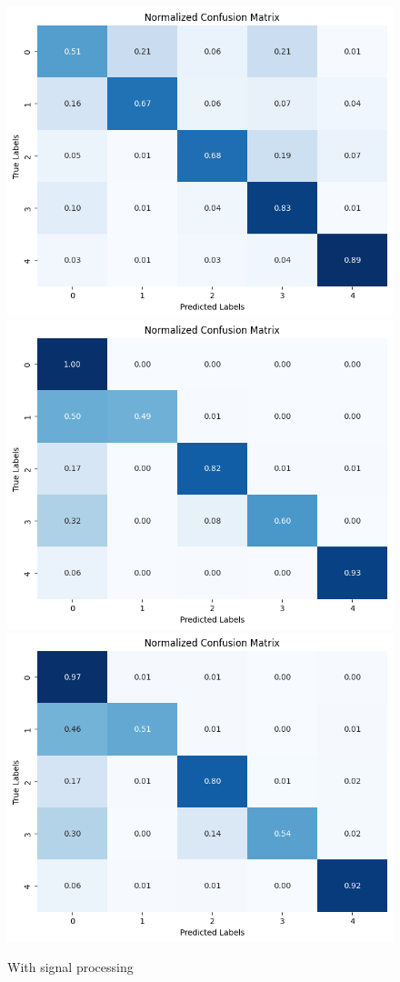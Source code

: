 \documentclass[runningheads]{llncs}
\begin{document}
\begin{figure}
    \centering
    \includegraphics[width=0.4\linewidth]{figs/svc_processed.png}
    \includegraphics[width=0.4\linewidth]{figs/random_forest_processed.png}
    \includegraphics[width=0.4\linewidth]{figs/d_tree_processed.png}
    \caption{With signal processing}
    \label{fig:data_transformed}
\end{figure}
\end{document}
